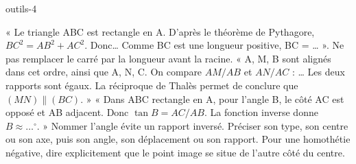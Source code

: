 \begin{blocEdition}{outils-4}

« Le triangle ABC est rectangle en A. D’après le théorème de Pythagore,
$BC^2=AB^2+AC^2$. Donc… Comme BC est une longueur positive, BC = … ».
Ne pas remplacer le carré par la longueur avant la racine.
« A, M, B sont alignés dans cet ordre, ainsi que A, N, C.
On compare $AM/AB$ et $AN/AC$ : … Les deux rapports sont égaux.
La réciproque de Thalès permet de conclure que $(MN)\parallel(BC)$. »
« Dans ABC rectangle en A, pour l’angle B, le côté AC est opposé et
AB adjacent. Donc $\tan B=AC/AB$. La fonction inverse donne
$B\approx\ldots^\circ$. » Nommer l’angle évite un rapport inversé.
Préciser son type, son centre ou son axe, puis son angle, son déplacement
ou son rapport. Pour une homothétie négative, dire explicitement que
le point image se situe de l’autre côté du centre.

\end{blocEdition}
